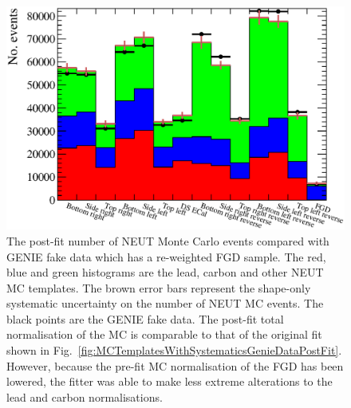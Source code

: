 \begin{figure}
  \centering
  \includegraphics[width=15cm]{images/measurement/validation/genie/MCTemplatesWithSystematics_GenieDataReWeighted_PostFit.eps}
  \caption{The post-fit number of NEUT Monte Carlo events compared with GENIE fake data which has a re-weighted FGD sample.  The red, blue and green histograms are the lead, carbon and other NEUT MC templates.  The brown error bars represent the shape-only systematic uncertainty on the number of NEUT MC events.  The black points are the GENIE fake data.  The post-fit total normalisation of the MC is comparable to that of the original fit shown in Fig.~\ref{fig:MCTemplatesWithSystematicsGenieDataPostFit}.  However, because the pre-fit MC normalisation of the FGD has been lowered, the fitter was able to make less extreme alterations to the lead and carbon normalisations.}
  \label{fig:MCTemplatesWithSystematicsGenieDataReWeightdPostFit}
\end{figure}

